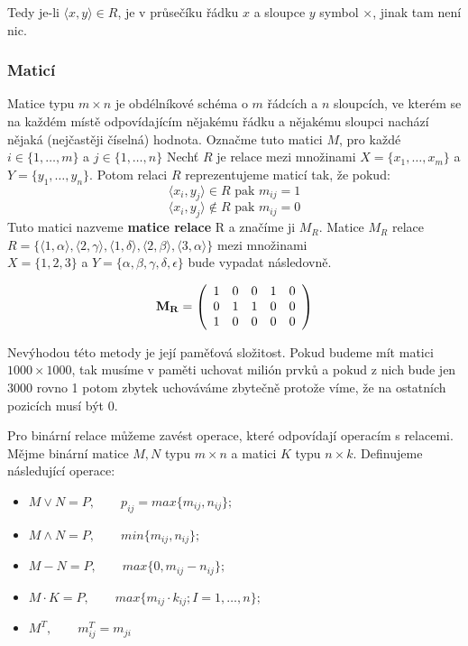 \documentclass[12pt,a4paper]{article}
\begin{document}
Tedy je-li $\langle x, y \rangle \in R$, je v průsečíku řádku $x$ a sloupce $y$ symbol $\times$, jinak tam není nic.

\subsubsection{Maticí}
Matice typu $m \times n$ je obdélníkové schéma o $m$ řádcích a $n$ sloupcích, ve kterém se na každém místě odpovídajícím nějakému řádku a nějakému sloupci nachází nějaká (nejčastěji číselná) hodnota. Označme tuto matici $M$, pro každé $i \in \{1, \dots,m\}$ a $j \in \{1,\dots,n\}$  Nechť $R$ je relace mezi množinami $X = \{x_1,\dots,x_m\}$ a $Y = \{y_1, \dots, y_n\}$. Potom relaci $R$ reprezentujeme maticí tak, že pokud:
$$\langle x_i,y_j\rangle \in R \text{ pak } m_{ij} = 1$$
$$\langle x_i,y_j\rangle \not\in R \text{ pak } m_{ij} = 0$$
Tuto matici nazveme \textbf{matice relace} R a značíme ji $M_R$. Matice $M_R$ relace $R = \{ \langle 1, \alpha \rangle, \langle 2, \gamma \rangle, \langle 1, \delta \rangle, \langle 2, \beta \rangle, \langle 3, \alpha \rangle\}$ mezi množinami \\$X = \{1,2,3\}$ a $Y = \{\alpha, \beta, \gamma, \delta, \epsilon\}$ bude vypadat  následovně.

\begin{displaymath}
{\bf M_R} =
\left( \begin{array}{ccccc}
1 & 0 & 0 & 1 & 0 \\
0 & 1 & 1 & 0 & 0 \\
1 & 0 & 0 & 0 & 0 \\
\end{array} \right)
\end{displaymath}

Nevýhodou této metody je její paměťová složitost. Pokud budeme mít matici $1000 \times 1000$, tak musíme v paměti uchovat milión prvků a pokud z nich bude jen 3000 rovno 1 potom zbytek uchováváme zbytečně protože víme, že na ostatních pozicích musí být 0.

Pro binární relace můžeme zavést operace, které odpovídají operacím s relacemi. Mějme binární matice $M,N$ typu $m \times n$ a matici $K$ typu $n \times k$. Definujeme následující operace:
\begin{itemize}
	\item[] $M \vee N = P, \qquad p_{ij} = max\{m_{ij}, n_{ij}\};$
	\item[] $M \wedge N = P, \qquad min\{m_{ij}, n_{ij}\};$
	\item[] $M - N = P, \qquad max\{0, m_{ij} - n_{ij}\};$
	\item[] $M \cdot K = P, \qquad max\{m_{ij} \cdot k_{ij}; I = 1, \dots ,n\};$
	\item[] $M^T, \qquad m^T_{ij} = m_{ji}$
\end{itemize}
\end{document}
